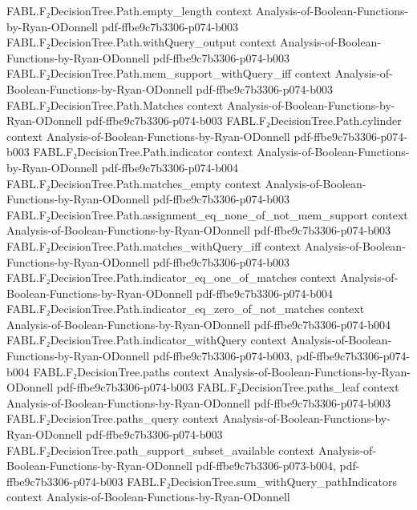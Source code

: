 \begin{theorem}
\proofstep
  {FABL.F₂DecisionTree.Path.empty_length}
  {context}
  {Analysis-of-Boolean-Functions-by-Ryan-ODonnell}
  {pdf-ffbe9c7b3306-p074-b003}
\proofstep
  {FABL.F₂DecisionTree.Path.withQuery_output}
  {context}
  {Analysis-of-Boolean-Functions-by-Ryan-ODonnell}
  {pdf-ffbe9c7b3306-p074-b003}
\proofstep
  {FABL.F₂DecisionTree.Path.mem_support_withQuery_iff}
  {context}
  {Analysis-of-Boolean-Functions-by-Ryan-ODonnell}
  {pdf-ffbe9c7b3306-p074-b003}
\proofstep
  {FABL.F₂DecisionTree.Path.Matches}
  {context}
  {Analysis-of-Boolean-Functions-by-Ryan-ODonnell}
  {pdf-ffbe9c7b3306-p074-b003}
\proofstep
  {FABL.F₂DecisionTree.Path.cylinder}
  {context}
  {Analysis-of-Boolean-Functions-by-Ryan-ODonnell}
  {pdf-ffbe9c7b3306-p074-b003}
\proofstep
  {FABL.F₂DecisionTree.Path.indicator}
  {context}
  {Analysis-of-Boolean-Functions-by-Ryan-ODonnell}
  {pdf-ffbe9c7b3306-p074-b004}
\proofstep
  {FABL.F₂DecisionTree.Path.matches_empty}
  {context}
  {Analysis-of-Boolean-Functions-by-Ryan-ODonnell}
  {pdf-ffbe9c7b3306-p074-b003}
\proofstep
  {FABL.F₂DecisionTree.Path.assignment_eq_none_of_not_mem_support}
  {context}
  {Analysis-of-Boolean-Functions-by-Ryan-ODonnell}
  {pdf-ffbe9c7b3306-p074-b003}
\proofstep
  {FABL.F₂DecisionTree.Path.matches_withQuery_iff}
  {context}
  {Analysis-of-Boolean-Functions-by-Ryan-ODonnell}
  {pdf-ffbe9c7b3306-p074-b003}
\proofstep
  {FABL.F₂DecisionTree.Path.indicator_eq_one_of_matches}
  {context}
  {Analysis-of-Boolean-Functions-by-Ryan-ODonnell}
  {pdf-ffbe9c7b3306-p074-b004}
\proofstep
  {FABL.F₂DecisionTree.Path.indicator_eq_zero_of_not_matches}
  {context}
  {Analysis-of-Boolean-Functions-by-Ryan-ODonnell}
  {pdf-ffbe9c7b3306-p074-b004}
\proofstep
  {FABL.F₂DecisionTree.Path.indicator_withQuery}
  {context}
  {Analysis-of-Boolean-Functions-by-Ryan-ODonnell}
  {pdf-ffbe9c7b3306-p074-b003,
    pdf-ffbe9c7b3306-p074-b004}
\proofstep
  {FABL.F₂DecisionTree.paths}
  {context}
  {Analysis-of-Boolean-Functions-by-Ryan-ODonnell}
  {pdf-ffbe9c7b3306-p074-b003}
\proofstep
  {FABL.F₂DecisionTree.paths_leaf}
  {context}
  {Analysis-of-Boolean-Functions-by-Ryan-ODonnell}
  {pdf-ffbe9c7b3306-p074-b003}
\proofstep
  {FABL.F₂DecisionTree.paths_query}
  {context}
  {Analysis-of-Boolean-Functions-by-Ryan-ODonnell}
  {pdf-ffbe9c7b3306-p074-b003}
\proofstep
  {FABL.F₂DecisionTree.path_support_subset_available}
  {context}
  {Analysis-of-Boolean-Functions-by-Ryan-ODonnell}
  {pdf-ffbe9c7b3306-p073-b004,
    pdf-ffbe9c7b3306-p074-b003}
\proofstep
  {FABL.F₂DecisionTree.sum_withQuery_pathIndicators}
  {context}
  {Analysis-of-Boolean-Functions-by-Ryan-ODonnell}

\end{theorem}
